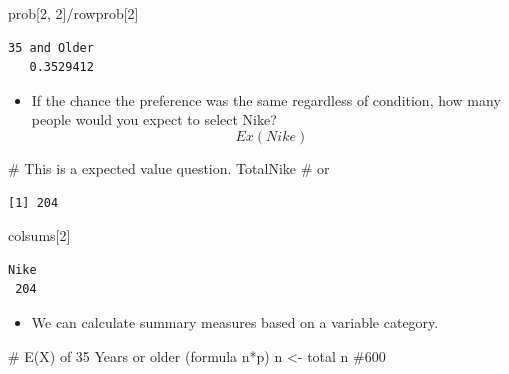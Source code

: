 \documentclass[
  letterpaper,
  DIV=11,
  numbers=noendperiod]{scrreprt}
\newenvironment{Shaded}{\begin{snugshade}}{\end{snugshade}}
\newcommand{\CommentTok}[1]{\textcolor[rgb]{0.37,0.37,0.37}{#1}}
\newcommand{\DecValTok}[1]{\textcolor[rgb]{0.68,0.00,0.00}{#1}}
\newcommand{\NormalTok}[1]{\textcolor[rgb]{0.00,0.23,0.31}{#1}}
\newcommand{\OtherTok}[1]{\textcolor[rgb]{0.00,0.23,0.31}{#1}}
\newcommand{\SpecialCharTok}[1]{\textcolor[rgb]{0.37,0.37,0.37}{#1}}
\providecommand{\tightlist}{%
  \setlength{\itemsep}{0pt}\setlength{\parskip}{0pt}}\usepackage{longtable,booktabs,array}
\begin{document}
\begin{Shaded}
\begin{Highlighting}[]
\NormalTok{prob[}\DecValTok{2}\NormalTok{, }\DecValTok{2}\NormalTok{]}\SpecialCharTok{/}\NormalTok{rowprob[}\DecValTok{2}\NormalTok{]}
\end{Highlighting}
\end{Shaded}

\begin{verbatim}
35 and Older 
   0.3529412 
\end{verbatim}

\begin{itemize}
\tightlist
\item
  If the chance the preference was the same regardless of condition, how
  many people would you expect to select Nike? \[Ex(Nike)\]
\end{itemize}

\begin{Shaded}
\begin{Highlighting}[]
\CommentTok{\# This is a expected value question.}
\NormalTok{TotalNike  }\CommentTok{\# or}
\end{Highlighting}
\end{Shaded}

\begin{verbatim}
[1] 204
\end{verbatim}

\begin{Shaded}
\begin{Highlighting}[]
\NormalTok{colsums[}\DecValTok{2}\NormalTok{]}
\end{Highlighting}
\end{Shaded}

\begin{verbatim}
Nike 
 204 
\end{verbatim}

\begin{itemize}
\tightlist
\item
  We can calculate summary measures based on a variable category.
\end{itemize}

\begin{Shaded}
\begin{Highlighting}[]
\CommentTok{\# E(X) of 35 Years or older (formula n*p)}
\NormalTok{n }\OtherTok{\textless{}{-}}\NormalTok{ total}
\NormalTok{n  }\CommentTok{\#600}
\end{Highlighting}
\end{Shaded}
\end{document}
